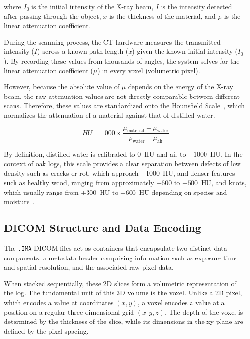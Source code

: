 \noindent where $I_0$ is the initial intensity of the X-ray beam, $I$ is the
 intensity detected after passing through the object, $x$ is the thickness of
the material, and $\mu$ is the linear attenuation coefficient.

During the scanning process, the CT hardware measures the transmitted intensity
($I$) across a known path length ($x$) given the known initial intensity
($I_0$). By recording these values from thousands of angles, the system solves for the linear attenuation coefficient ($\mu$) in every voxel (volumetric pixel).

However, because the absolute value of $\mu$ depends on the energy of the
X-ray beam, the raw attenuation values are not directly comparable
between different scans. Therefore, these values are standardized onto the
Hounsfield Scale~\cite{hounsfield1973computerized}, which normalizes the attenuation of a material against that
of distilled water.

\begin{equation}
 HU = 1000 \times
 \frac{\mu_{\text{material}} - \mu_{\text{water}}}
{\mu_{\text{water}} - \mu_{\text{air}}}
 \label{eq:hu_definition}
\end{equation}

By definition, distilled water is calibrated to 0~HU and air to $-1000$~HU. In the context of oak logs, this scale provides a clear separation between defects of low density such as cracks or rot, which approach $-1000$~HU, and denser features such as healthy wood, ranging from approximately $-600$ to $+500$~HU, and knots, which usually range from $+300$~HU to $+600$~HU depending on species and moisture~\cite{freyburger2009measuring}.

\subsection{DICOM Structure and Data Encoding}

The \texttt{.IMA} DICOM files act as containers that encapsulate two distinct
data components: a metadata header comprising information such as exposure
time and spatial resolution, and the associated raw pixel data.

When stacked sequentially, these 2D slices form a volumetric representation of
the log. The fundamental unit of this 3D volume is the voxel. Unlike a 2D pixel, which encodes a value at coordinates $(x, y)$, a
voxel encodes a value at a position on a regular three-dimensional grid 
$(x, y, z)$. The depth of the voxel is determined by the thickness of the slice, while its dimensions in the xy plane are defined by the pixel spacing.

